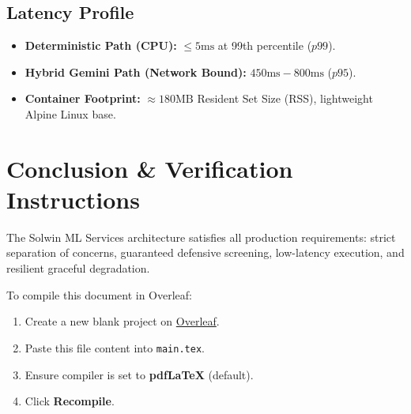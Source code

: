 \documentclass[11pt,a4paper]{article}
\begin{document}
\subsection{Latency Profile}
\begin{itemize}[leftmargin=*]
    \item \textbf{Deterministic Path (CPU):} $\leq 5\text{ms}$ at 99th percentile ($p99$).
    \item \textbf{Hybrid Gemini Path (Network Bound):} $450\text{ms} - 800\text{ms}$ ($p95$).
    \item \textbf{Container Footprint:} $\approx 180\text{MB}$ Resident Set Size (RSS), lightweight Alpine Linux base.
\end{itemize}

\section{Conclusion \& Verification Instructions}
The Solwin ML Services architecture satisfies all production requirements: strict separation of concerns, guaranteed defensive screening, low-latency execution, and resilient graceful degradation.

To compile this document in Overleaf:
\begin{enumerate}[leftmargin=*]
    \item Create a new blank project on \href{https://www.overleaf.com}{Overleaf}.
    \item Paste this file content into \texttt{main.tex}.
    \item Ensure compiler is set to \textbf{pdfLaTeX} (default).
    \item Click \textbf{Recompile}.
\end{enumerate}
\end{document}
